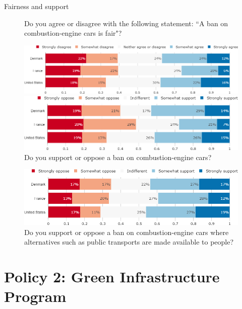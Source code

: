 \documentclass[aspectratio=169,9pt,dvipsnames]{beamer}
\begin{document}
\begin{frame}{Fairness and support}%
\begin{figure}[h!]
\centering
\caption{Do you agree or disagree with the following statement: ``A ban on combustion-engine cars is fair"?}
\includegraphics[width=.7\textwidth]{../figures/country_comparison/standard_fair_countries.png}
\vspace{.5cm}
\centering
\caption{Do you support or oppose a ban on combustion-engine cars?}
\includegraphics[width=.7\textwidth]{../figures/country_comparison/standard_support_countries.png}
\end{figure}

\end{frame}


\begin{frame}{}%
\begin{figure}[h!]
\centering
\caption{Do you support or oppose a ban on combustion-engine cars where alternatives such as public transports are made available to people?}
\includegraphics[width=\textwidth]{../figures/country_comparison/standard_public_transport_support_countries.png}
\end{figure}
\end{frame}

\section{Policy 2: Green Infrastructure Program}
\end{document}
